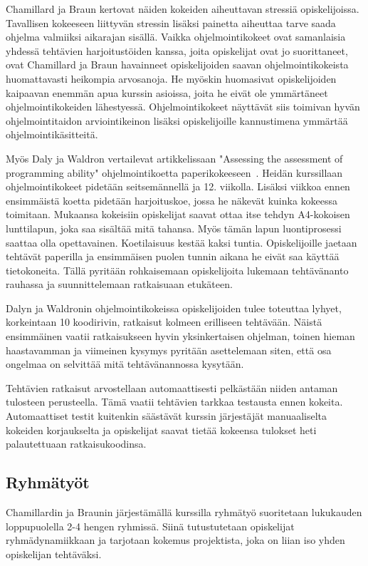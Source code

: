 \documentclass[finnish]{../tktltiki2}
\theoremstyle{definition}
\theoremstyle{remark}
\begin{document}
Chamillard ja Braun kertovat näiden kokeiden aiheuttavan stressiä opiskelijoissa. Tavallisen kokeeseen liittyvän stressin lisäksi painetta aiheuttaa tarve saada ohjelma valmiiksi aikarajan sisällä. Vaikka ohjelmointikokeet ovat samanlaisia yhdessä tehtävien harjoitustöiden kanssa, joita opiskelijat ovat jo suorittaneet, ovat Chamillard ja Braun havainneet opiskelijoiden saavan ohjelmointikokeista huomattavasti heikompia arvosanoja. He myöskin huomasivat opiskelijoiden kaipaavan enemmän apua kurssin asioissa, joita he eivät ole ymmärtäneet ohjelmointikokeiden lähestyessä. Ohjelmointikokeet näyttävät siis toimivan hyvän ohjelmointitaidon arviointikeinon lisäksi opiskelijoille kannustimena ymmärtää ohjelmointikäsitteitä.

Myös Daly ja Waldron vertailevat artikkelissaan "Assessing the assessment of programming ability" ohjelmointikoetta paperikokeeseen~\cite{DW04}. Heidän kurssillaan ohjelmointikokeet pidetään seitsemännellä ja 12. viikolla. Lisäksi viikkoa ennen ensimmäistä koetta pidetään harjoituskoe, jossa he näkevät kuinka kokeessa toimitaan. Mukaansa kokeisiin opiskelijat saavat ottaa itse tehdyn A4-kokoisen lunttilapun, joka saa sisältää mitä tahansa. Myös tämän lapun luontiprosessi saattaa olla opettavainen. Koetilaisuus kestää kaksi tuntia. Opiskelijoille jaetaan tehtävät paperilla ja ensimmäisen puolen tunnin aikana he eivät saa käyttää tietokoneita. Tällä pyritään rohkaisemaan opiskelijoita lukemaan tehtävänanto rauhassa ja suunnittelemaan ratkaisuaan etukäteen.

Dalyn ja Waldronin ohjelmointikokeissa opiskelijoiden tulee toteuttaa lyhyet, korkeintaan 10 koodirivin, ratkaisut kolmeen erilliseen tehtävään. Näistä ensimmäinen vaatii ratkaisukseen hyvin yksinkertaisen ohjelman, toinen hieman haastavamman ja viimeinen kysymys pyritään asettelemaan siten, että osa ongelmaa on selvittää mitä tehtävänannossa kysytään.

Tehtävien ratkaisut arvostellaan automaattisesti pelkästään niiden antaman tulosteen perusteella. Tämä vaatii tehtävien tarkkaa testausta ennen kokeita. Automaattiset testit kuitenkin säästävät kurssin järjestäjät manuaaliselta kokeiden korjaukselta ja opiskelijat saavat tietää kokeensa tulokset heti palautettuaan ratkaisukoodinsa.

\subsection{Ryhmätyöt}

Chamillardin ja Braunin järjestämällä kurssilla ryhmätyö suoritetaan lukukauden loppupuolella 2-4 hengen ryhmissä. Siinä tutustutetaan opiskelijat ryhmädynamiikkaan ja tarjotaan kokemus projektista, joka on liian iso yhden opiskelijan tehtäväksi.
\end{document}
